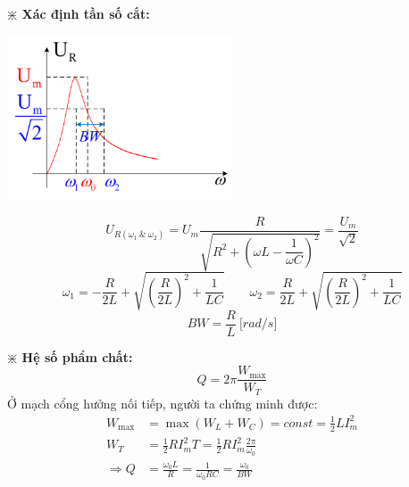 \textbf{$\divideontimes$ Xác định tần số cắt:}
\begin{center}
    \includegraphics[width = 0.5\textwidth]{./image/67.png}
\end{center}
\begin{equation}
    U_{R(\omega_1 \ \& \ \omega_2)} = U_m \frac{R}{\sqrt{R^2 + \left(\omega L - \dfrac{1}{\omega C}\right)^2}} = \frac{U_m}{\sqrt{2}}
\end{equation}
\begin{equation}
    \omega_1 = -\frac{R}{2L} + \sqrt{\left( \frac{R}{2L} \right)^2 + \frac{1}{LC}} \qquad \omega_2 = \frac{R}{2L} + \sqrt{\left( \frac{R}{2L} \right)^2 + \frac{1}{LC}}
\end{equation}
\begin{equation}
    BW = \frac{R}{L} \ \lbrack rad/s \rbrack
\end{equation}

\textbf{$\divideontimes$ Hệ số phẩm chất:}
\begin{equation*}
    Q = 2\pi \frac{W_{\max}}{W_T}
\end{equation*}
Ở mạch cổng hưởng nối tiếp, người ta chứng minh được:
\begin{equation}
    \begin{aligned}
        W_{\max} &= \max (W_L + W_C) = const = \frac{1}{2}LI^2_m \\
        W_T &= \frac{1}{2}RI^2_m T = \frac{1}{2}RI^2_m \frac{2\pi}{\omega_0} \\
        \Rightarrow Q &= \frac{\omega_0 L}{R} = \frac{1}{\omega_0 RC} = \frac{\omega_0}{BW}
    \end{aligned}
\end{equation}

